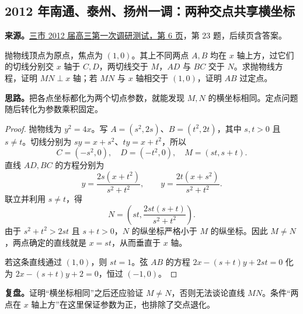 \documentclass[UTF8]{ctexart}
\begin{document}
\subsection{2012 年南通、泰州、扬州一调：两种交点共享横坐标}\label{sec:c2012nty1}
\textbf{来源。}\href{https://doc.xuehai.net/b8780209d98e4d302aafd63ce-6.html}{三市 2012 届高三第一次调研测试，第 6 页}，第 23 题，后续页含答案。
\begin{example}[题意]
抛物线顶点为原点，焦点为 $(1,0)$。其上不同两点 $A,B$ 均在 $x$ 轴上方，过它们的切线分别交 $x$ 轴于 $C,D$，两切线交于 $M$，$AD$ 与 $BC$ 交于 $N$。求抛物线方程，证明 $MN\perp x$ 轴；若 $MN$ 与 $x$ 轴相交于 $(1,0)$，证明 $AB$ 过定点。
\end{example}
\textbf{思路。}把各点坐标都化为两个切点参数，就能发现 $M,N$ 的横坐标相同。定点问题随后转化为参数乘积固定。
\begin{proof}
抛物线为 $y^2=4x$。写 $A=(s^2,2s)$、$B=(t^2,2t)$，其中 $s,t>0$ 且 $s\ne t$。切线分别为 $sy=x+s^2$、$ty=x+t^2$，所以
\[
C=(-s^2,0),\quad D=(-t^2,0),\quad M=(st,s+t).
\]
直线 $AD,BC$ 的方程分别为
\[
y=\frac{2s(x+t^2)}{s^2+t^2},\qquad
y=\frac{2t(x+s^2)}{s^2+t^2}.
\]
联立并利用 $s\ne t$，得
\[
N=\left(st,\frac{2st(s+t)}{s^2+t^2}\right).
\]
由于 $s^2+t^2>2st$ 且 $s+t>0$，$N$ 的纵坐标严格小于 $M$ 的纵坐标。因此 $M\ne N$，两点确定的直线就是 $x=st$，从而垂直于 $x$ 轴。

若这条直线通过 $(1,0)$，则 $st=1$。弦 $AB$ 的方程 $2x-(s+t)y+2st=0$ 化为 $2x-(s+t)y+2=0$，恒过 $(-1,0)$。
\end{proof}
\textbf{复盘。}证明“横坐标相同”之后还应验证 $M\ne N$，否则无法谈论直线 $MN$。条件“两点在 $x$ 轴上方”在这里保证参数为正，也排除了交点退化。
\end{document}
